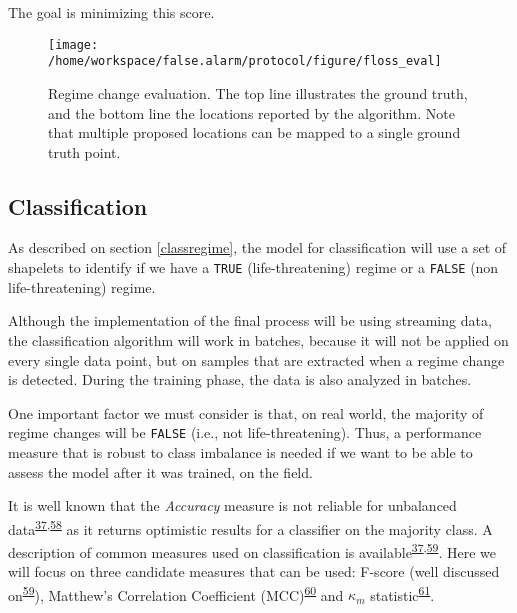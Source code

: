 \documentclass[12pt,twoside]{fmupthesis}
\begin{document}
The goal is minimizing this score.
\begin{figure}

{\centering \texttt{[image: /home/workspace/false.alarm/protocol/figure/floss\_eval]} 

}

\caption{Regime change evaluation. The top line illustrates the ground truth, and the bottom line the locations reported by the algorithm. Note that multiple proposed locations can be mapped to a single ground truth point.}\label{fig:flosseval}
\end{figure}
\hypertarget{classification}{%
\subsection{Classification}\label{classification}}

As described on section \ref{classregime}, the model for classification will use a set of shapelets
to identify if we have a \texttt{TRUE} (life-threatening) regime or a \texttt{FALSE} (non life-threatening) regime.

Although the implementation of the final process will be using streaming data, the classification
algorithm will work in batches, because it will not be applied on every single data point, but on
samples that are extracted when a regime change is detected. During the training phase, the data is
also analyzed in batches.

One important factor we must consider is that, on real world, the majority of regime changes will be
\texttt{FALSE} (i.e., not life-threatening). Thus, a performance measure that is robust to class imbalance
is needed if we want to be able to assess the model after it was trained, on the field.

It is well known that the \emph{Accuracy} measure is not reliable for unbalanced data\textsuperscript{\protect\hyperlink{ref-Akosa2017}{37},\protect\hyperlink{ref-Bekkar2013}{58}} as it returns optimistic results for a classifier on the majority class. A
description of common measures used on classification is available\textsuperscript{\protect\hyperlink{ref-Akosa2017}{37},\protect\hyperlink{ref-Chicco2020}{59}}. Here
we will focus on three candidate measures that can be used: F-score (well discussed on\textsuperscript{\protect\hyperlink{ref-Chicco2020}{59}}), Matthew's Correlation Coefficient (MCC)\textsuperscript{\protect\hyperlink{ref-Matthews1975}{60}} and \(\kappa_m\) statistic\textsuperscript{\protect\hyperlink{ref-Bifet2015}{61}}.
\end{document}
